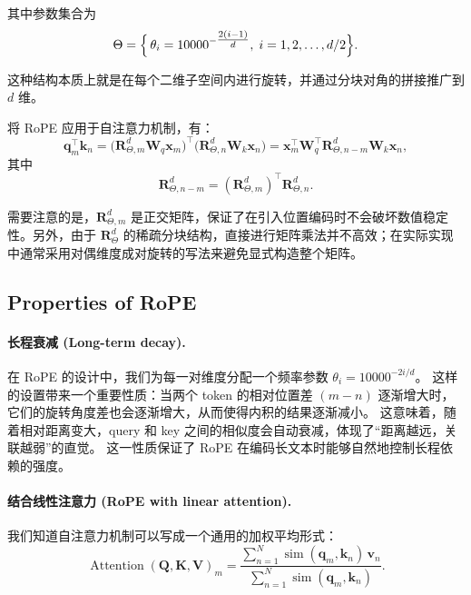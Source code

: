 其中参数集合为
\[
\Theta = \Bigl\{\,\theta_i = 10000^{-\tfrac{2(i-1)}{d}},\; i=1,2,\dots,d/2\Bigr\}.
\]

这种结构本质上就是在每个二维子空间内进行旋转，并通过分块对角的拼接推广到 $d$ 维。

\vspace{0.5em}
将 RoPE 应用于自注意力机制，有：
\begin{equation}
	\mathbf{q}_m^{\top}\mathbf{k}_n
	= \bigl(\mathbf{R}^d_{\Theta, m}\mathbf{W}_q\mathbf{x}_m\bigr)^{\!\top}
	\bigl(\mathbf{R}^d_{\Theta, n}\mathbf{W}_k\mathbf{x}_n\bigr)
	= \mathbf{x}_m^{\top}\mathbf{W}_q^\top \mathbf{R}^d_{\Theta, n-m}\mathbf{W}_k\mathbf{x}_n,
	\label{fn:rope-qk}
\end{equation}
其中
\[
\mathbf{R}^d_{\Theta, n-m} = (\mathbf{R}^d_{\Theta, m})^\top \mathbf{R}^d_{\Theta, n}.
\]

需要注意的是，$\mathbf{R}^d_{\Theta,m}$ 是正交矩阵，保证了在引入位置编码时不会破坏数值稳定性。另外，由于 $\mathbf{R}^d_{\Theta}$ 的稀疏分块结构，直接进行矩阵乘法并不高效；在实际实现中通常采用对偶维度成对旋转的写法来避免显式构造整个矩阵。

\subsection{Properties of RoPE}
\label{sec:prop-of-RoPE}

\paragraph{长程衰减 (Long-term decay).} 
在 RoPE 的设计中，我们为每一对维度分配一个频率参数 $\theta_i=10000^{-2i/d}$。  
这样的设置带来一个重要性质：当两个 token 的相对位置差 $(m-n)$ 逐渐增大时，它们的旋转角度差也会逐渐增大，从而使得内积的结果逐渐减小。  
这意味着，随着相对距离变大，query 和 key 之间的相似度会自动衰减，体现了“距离越远，关联越弱”的直觉。  
这一性质保证了 RoPE 在编码长文本时能够自然地控制长程依赖的强度。

\paragraph{结合线性注意力 (RoPE with linear attention).} 
我们知道自注意力机制可以写成一个通用的加权平均形式：
\begin{equation}
	\operatorname{Attention}(\mathbf{Q},\mathbf{K},\mathbf{V})_m
	= \frac{\sum_{n=1}^{N}\operatorname{sim}(\mathbf{q}_m,\mathbf{k}_n)\,\mathbf{v}_n}
	{\sum_{n=1}^{N}\operatorname{sim}(\mathbf{q}_m,\mathbf{k}_n)}.
	\label{fn:atten-full}
\end{equation}

